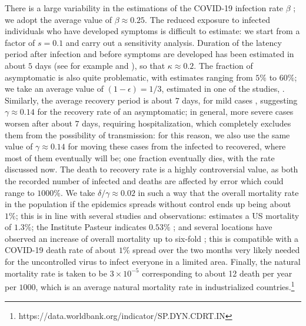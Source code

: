 \documentclass{amsart}
\begin{document}
 

There is a large variability in
the estimations of the COVID-19 infection rate $\beta$ \cite{AT};
we adopt the average value of
$\beta\approx 0.25$.
The reduced exposure to infected individuals who have 
developed symptoms is difficult to estimate: 
we start from a factor of $s=0.1$ and carry out a sensitivity analysis.
Duration of the latency period after infection
and before symptoms are developed has been 
estimated in about $5$ days (see for example \cite{QL} and \cite{K-W}), so that $\kappa \approx 0.2$.
The fraction of asymptomatic is also quite problematic,
with estimates ranging from $5\%$ to $60\%$; 
we take an average value of $(1-\epsilon)=1/3$, 
estimated in one of the studies, \cite{N}.
Similarly, the average recovery period is about
$7$ days, for mild cases
\cite{Byrne}, suggesting $\gamma \approx 0.14$
for the recovery rate of an asymptomatic;
in general, more severe cases worsen after
about $7$ days, requiring hospitalization, which completely excludes
them from the possibility of transmission: for this
reason, we also use the same value of $\gamma \approx 0.14$
for moving these cases from the infected to recovered,
where most of them eventually will be;
one fraction eventually dies, with the rate discussed now.
The death to recovery rate is a highly controversial 
value, as both the recorded number of infected
and deaths are affected by error which could range to 
$1000\%$. We take $\delta/\gamma \approx 0.02$ in such a
way that the overall mortality rate in the population
if the epidemics spreads without control ends up being
about $1\%$; this is in line with several studies and observations:
\cite{AB} estimates a US mortality of $1.3\%$;
 the Institute Pasteur indicates  $0.53\%$ \cite{salje2020estimating};
   and several locations have observed an increase of
   overall mortality up to six-fold \cite{ISTAT}; this is compatible
with a COVID-19 death rate of about $1\%$ 
spread over the two months very likely needed for the uncontrolled 
virus to infect everyone in a limited area. Finally, the natural mortality rate is taken to be $3 \times 10^{-5}$  corresponding to about 12
death per year per $1000$, 
which is an average natural mortality  rate in industrialized countries.\footnote{https://data.worldbank.org/indicator/SP.DYN.CDRT.IN\color{black}} 
\end{document}
